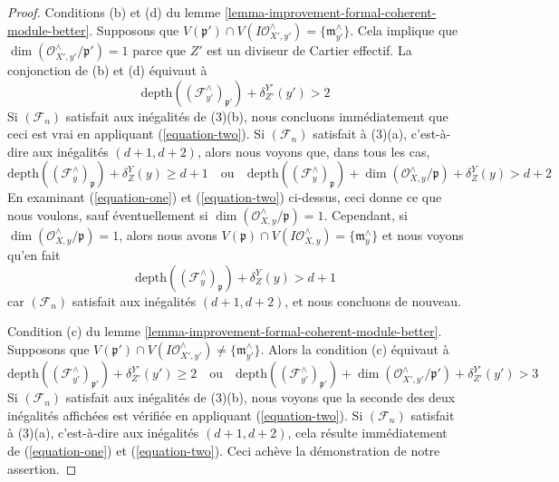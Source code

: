 \begin{proof}
\medskip\noindent
Conditions (b) et (d) du
lemme \ref{lemma-improvement-formal-coherent-module-better}. Supposons que
$V(\mathfrak p') \cap V(I\mathcal{O}_{X', y'}^\wedge) =
\{\mathfrak m_{y'}^\wedge\}$.
Cela implique que $\dim(\mathcal{O}_{X', y'}^\wedge/\mathfrak p') = 1$
parce que $Z'$ est un diviseur de Cartier effectif.
La conjonction de (b) et (d) équivaut à
$$
\text{depth}((\mathcal{F}_{y'}^\wedge)_{\mathfrak p'}) + \delta^{Y'}_{Z'}(y')
> 2
$$
Si $(\mathcal{F}_n)$ satisfait aux inégalités de (3)(b),
nous concluons immédiatement que ceci est vrai en appliquant (\ref{equation-two}).
Si $(\mathcal{F}_n)$ satisfait à (3)(a), c'est-à-dire aux
inégalités $(d + 1, d + 2)$, alors nous voyons que, dans tous les cas,
$$
\text{depth}((\mathcal{F}_y^\wedge)_{\mathfrak p}) + \delta^Y_Z(y)
\geq d + 1
\quad\text{ou}\quad
\text{depth}((\mathcal{F}_y^\wedge)_{\mathfrak p}) +
\dim(\mathcal{O}_{X, y}^\wedge/\mathfrak p) +
\delta^Y_Z(y) > d + 2
$$
En examinant (\ref{equation-one}) et (\ref{equation-two}) ci-dessus, ceci donne
ce que nous voulons, sauf éventuellement si
$\dim(\mathcal{O}_{X, y}^\wedge/\mathfrak p) = 1$.
Cependant, si $\dim(\mathcal{O}_{X, y}^\wedge/\mathfrak p) = 1$, alors nous avons
$V(\mathfrak p) \cap V(I\mathcal{O}_{X, y}^\wedge) = \{\mathfrak m_y^\wedge\}$
et nous voyons qu'en fait
$$
\text{depth}((\mathcal{F}_y^\wedge)_{\mathfrak p}) + \delta^Y_Z(y) > d + 1
$$
car $(\mathcal{F}_n)$ satisfait aux inégalités $(d + 1, d + 2)$, et nous
concluons de nouveau.

\medskip\noindent
Condition (c) du
lemme \ref{lemma-improvement-formal-coherent-module-better}. Supposons que
$V(\mathfrak p') \cap V(I\mathcal{O}_{X', y'}^\wedge) \not =
\{\mathfrak m_{y'}^\wedge\}$. Alors la condition (c) équivaut à
$$
\text{depth}((\mathcal{F}_{y'}^\wedge)_{\mathfrak p'}) + \delta^{Y'}_{Z'}(y')
\geq 2
\quad\text{ou}\quad
\text{depth}((\mathcal{F}_{y'}^\wedge)_{\mathfrak p'}) +
\dim(\mathcal{O}_{X', y'}^\wedge/\mathfrak p') +
\delta^{Y'}_{Z'}(y') > 3
$$
Si $(\mathcal{F}_n)$ satisfait aux inégalités de (3)(b),
nous voyons que la seconde des deux inégalités affichées est vérifiée
en appliquant (\ref{equation-two}). Si $(\mathcal{F}_n)$ satisfait à (3)(a), c'est-à-dire
aux inégalités $(d + 1, d + 2)$, cela résulte immédiatement de
(\ref{equation-one}) et (\ref{equation-two}).
Ceci achève la démonstration de notre assertion.


\end{proof}
